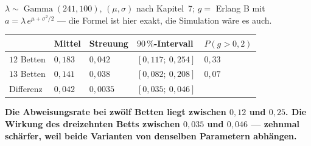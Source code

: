 \begin{merksatz}
$\lambda\sim\operatorname{Gamma}(241, 100)$, $(\mu,\sigma)$ nach Kapitel~7; $g = $ Erlang B mit $a = \lambda\,e^{\mu+\sigma^2/2}$ --- die Formel ist hier exakt, die Simulation wäre es auch.

\begin{center}
{\small
\renewcommand{\arraystretch}{1.48}
\begin{tabular}{@{}P{2.4cm}P{1.8cm}P{1.6cm}P{2.6cm}P{1.8cm}@{}}
\toprule
& \textbf{Mittel} & \textbf{Streuung} & \textbf{$90\,\%$-Intervall} & $P(g>0{,}2)$\\
\midrule
$12$ Betten & $0{,}183$ & $0{,}042$ & $[0{,}117;\ 0{,}254]$ & $0{,}33$\\
$13$ Betten & $0{,}141$ & $0{,}038$ & $[0{,}082;\ 0{,}208]$ & $0{,}07$\\
\midrule
Differenz & $0{,}042$ & $0{,}0035$ & $[0{,}035;\ 0{,}046]$ & \\
\bottomrule
\end{tabular}}
\end{center}

\begin{center}
\begin{minipage}{0.9\textwidth}
\textbf{Die Abweisungsrate bei zwölf Betten liegt zwischen $0{,}12$ und $0{,}25$. Die Wirkung des dreizehnten Betts zwischen $0{,}035$ und $0{,}046$ --- zehnmal schärfer, weil beide Varianten von denselben Parametern abhängen.}
\end{minipage}
\end{center}

\begin{center}
\begin{minipage}{0.88\textwidth}
\end{minipage}
\end{center}
\end{merksatz}

